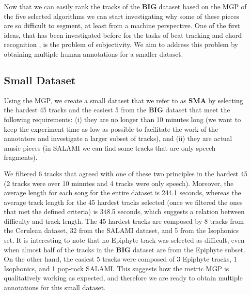 \documentclass{article}
\begin{document}
Now that we can easily rank the tracks of the \textbf{BIG} dataset based on the MGP of the five selected algorithms we can start investigating why some of these pieces are so difficult to segment, at least from a machine perspective. 
One of the first ideas, that has been investigated before for the tasks of beat tracking \cite{Grosche2010} and chord recognition \cite{Ni2013}, is the problem of subjectivity.
We aim to address this problem by obtaining multiple human annotations for a smaller dataset.

\subsection{Small Dataset}

Using the MGP, we create a small dataset that we refer to as \textbf{SMA} by selecting the hardest 45 tracks and the easiest 5 from the \textbf{BIG} dataset that meet the following requirements: (i) they are no longer than 10 minutes long (we want to keep the experiment time as low as possible to facilitate the work of the annotators and investigate a larger subset of tracks), and (ii) they are actual music pieces (in SALAMI we can find some tracks that are only speech fragments).

We filtered 6 tracks that agreed with one of these two principles in the hardest 45 (2 tracks were over 10 minutes and 4 tracks were only speech). 
Moreover, the average length for each song for the entire dataset is 244.1 seconds, whereas the average track length for the 45 hardest tracks selected (once we filtered the ones that met the defined criteria) is 348.5 seconds, which suggests a relation between difficulty and track length.
The 45 hardest tracks are composed by 8 tracks from the Cerulean dataset, 32 from the SALAMI dataset, and 5 from the Isophonics set.
It is interesting to note that no Epiphyte track was selected as difficult, even when almost half of the tracks in the \textbf{BIG} dataset are from the Epiphyte subset.
On the other hand, the easiest 5 tracks were composed of 3 Epiphyte tracks, 1 Isophonics, and 1 pop-rock SALAMI.
This suggests how the metric MGP is qualitatively working as expected, and therefore we are ready to obtain multiple annotations for this small dataset.
\end{document}
